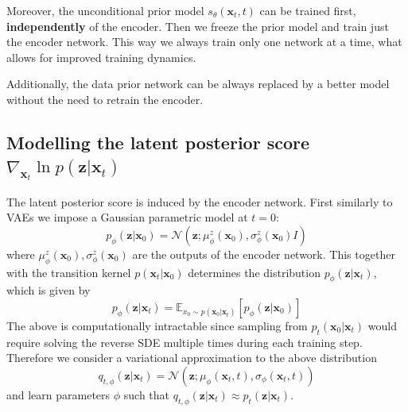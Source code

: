 Moreover, the unconditional prior model $s_\theta(\textbf{x}_t, t)$ can be trained first, \textbf{independently} of the encoder. Then we freeze the prior model and train just the encoder network. This way we always train only one network at a time, what allows for improved training dynamics.

Additionally, the data prior network can be always replaced by a better model without the need to retrain the encoder.


\subsection{Modelling the latent posterior score $\nabla_{\textbf{x}_t}  \ln{p(\textbf{z} | \textbf{x}_t )}$}
The latent posterior score is induced by the encoder network. First similarly to VAEs we impose a Gaussian parametric model at $t=0$:
\begin{equation*}
    p_\phi(\textbf{z} | \textbf{x}_0 ) = \mathcal{N}(\textbf{z} ; \mu^z_\phi(\textbf{x}_0), \sigma^z_\phi(\textbf{x}_0)I)
\end{equation*}
where $ \mu^z_\phi(\textbf{x}_0), \sigma^z_\phi(\textbf{x}_0)$ are the outputs of the encoder network.
This together with the transition kernel $p(\textbf{x}_t| \textbf{x}_0)$ determines the distribution $p_\phi(\textbf{z} | \textbf{x}_t)$, which is given by
\begin{equation}
\label{ch4:eq:true_posterior}
    p_\phi(\textbf{z} | \textbf{x}_t) = \mathbb{E}_{x_0 \sim p(\textbf{x}_0 | \textbf{x}_t)}[p_\phi( \textbf{z} | \textbf{x}_0)]
\end{equation}
The above is computationally intractable since sampling from $ p_t(\textbf{x}_0 | \textbf{x}_t)$ would require solving the reverse SDE multiple times during each training step. Therefore we consider a variational approximation to the above distribution 
\begin{equation}\label{ch4:definition_of_variational_approximation}
    q_{t, \phi}(\textbf{z}|\textbf{x}_t) =  \mathcal{N}(\textbf{z} ; \mu_\phi(\textbf{x}_t , t), \sigma_\phi(\textbf{x}_t, t))
\end{equation}
and learn parameters $\phi$ such that $q_{t, \phi}(\textbf{z}|\textbf{x}_t) \approx p_t(\textbf{z}|\textbf{x}_t)$.


